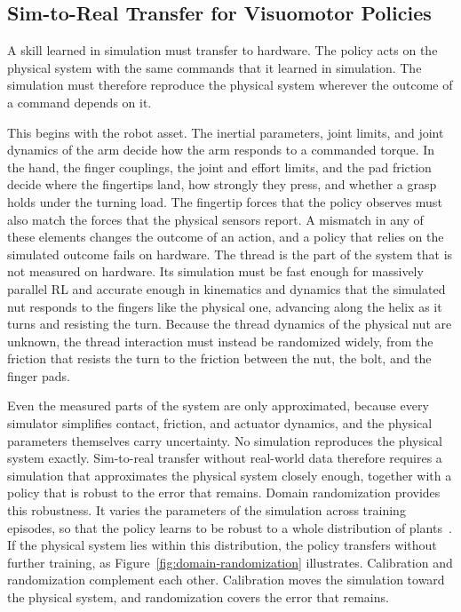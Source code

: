 \subsection{Sim-to-Real Transfer for Visuomotor Policies}\label{sec:difficulty-transfer}

A skill learned in simulation must transfer to hardware. The policy acts on the physical system with the same commands that it learned in simulation. The simulation must therefore reproduce the physical system wherever the outcome of a command depends on it.

This begins with the robot asset. The inertial parameters, joint limits, and joint dynamics of the arm decide how the arm responds to a commanded torque. In the hand, the finger couplings, the joint and effort limits, and the pad friction decide where the fingertips land, how strongly they press, and whether a grasp holds under the turning load. The fingertip forces that the policy observes must also match the forces that the physical sensors report. A mismatch in any of these elements changes the outcome of an action, and a policy that relies on the simulated outcome fails on hardware.
The thread is the part of the system that is not measured on hardware. Its simulation must be fast enough for massively parallel \ac{RL} and accurate enough in kinematics and dynamics that the simulated nut responds to the fingers like the physical one, advancing along the helix as it turns and resisting the turn. Because the thread dynamics of the physical nut are unknown, the thread interaction must instead be randomized widely, from the friction that resists the turn to the friction between the nut, the bolt, and the finger pads.

Even the measured parts of the system are only approximated, because every simulator simplifies contact, friction, and actuator dynamics, and the physical parameters themselves carry uncertainty. No simulation reproduces the physical system exactly. Sim-to-real transfer without real-world data therefore requires a simulation that approximates the physical system closely enough, together with a policy that is robust to the error that remains. Domain randomization provides this robustness. It varies the parameters of the simulation across training episodes, so that the policy learns to be robust to a whole distribution of plants~\cite{Tobin2017}. If the physical system lies within this distribution, the policy transfers without further training, as Figure~\ref{fig:domain-randomization} illustrates. Calibration and randomization complement each other. Calibration moves the simulation toward the physical system, and randomization covers the error that remains.

